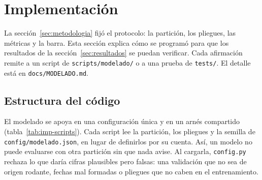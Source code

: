 \section{Implementación}\label{sec:implementacion}

La sección~\ref{sec:metodologia} fijó el protocolo: la partición, los pliegues, las métricas y la barra. Esta sección explica cómo se programó para que los resultados de la sección~\ref{sec:resultados} se puedan verificar. Cada afirmación remite a un script de \texttt{scripts/\allowbreak{}modelado/} o a una prueba de \texttt{tests/}. El detalle está en \texttt{docs/\allowbreak{}MODELADO.md}.

\subsection{Estructura del código}\label{sec:imp-codigo}

El modelado se apoya en una configuración única y en un arnés compartido (tabla~\ref{tab:imp-scripts}). Cada script lee la partición, los pliegues y la semilla de \texttt{config/\allowbreak{}modelado.json}, en lugar de definirlos por su cuenta. Así, un modelo no puede evaluarse con otra partición sin que nada avise. Al cargarla, \texttt{config.py} rechaza lo que daría cifras plausibles pero falsas: una validación que no sea de origen rodante, fechas mal formadas o pliegues que no caben en el entrenamiento.

